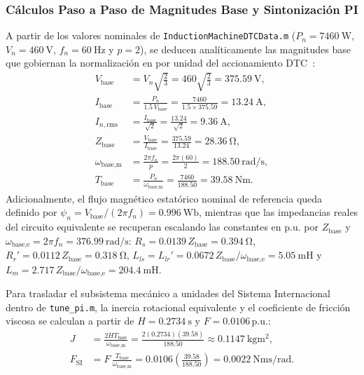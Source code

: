 \subsubsection{Cálculos Paso a Paso de Magnitudes Base y Sintonización PI}
A partir de los valores nominales de \texttt{Induction\allowbreak Machine\allowbreak DTC\allowbreak Data.m} ($P_n=\qty{7460}{\watt}$, $V_n=\qty{460}{\volt}$, $f_n=\qty{60}{\hertz}$ y $p=2$), se deducen analíticamente las magnitudes base que gobiernan la normalización en por unidad del accionamiento DTC~\cite{Bose2006,Krishnan2001}:
\begin{align}
    V_{\text{base}} &= V_n\sqrt{\frac{2}{3}} = 460\sqrt{\frac{2}{3}} = \qty{375.59}{\volt}, \label{eq:vbase_calc}\\
    I_{\text{base}} &= \frac{P_n}{1.5\,V_{\text{base}}} = \frac{7460}{1.5\times 375.59} = \qty{13.24}{\ampere}, \label{eq:ibase_calc}\\
    I_{n,\text{rms}} &= \frac{I_{\text{base}}}{\sqrt{2}} = \frac{13.24}{\sqrt{2}} = \qty{9.36}{\ampere}, \label{eq:inrms_calc}\\
    Z_{\text{base}} &= \frac{V_{\text{base}}}{I_{\text{base}}} = \frac{375.59}{13.24} = \qty{28.36}{\ohm}, \label{eq:zbase_calc}\\
    \omega_{\text{base,m}} &= \frac{2\pi f_n}{p} = \frac{2\pi(60)}{2} = \qty{188.50}{\radian\per\second}, \label{eq:wbasem_calc}\\
    T_{\text{base}} &= \frac{P_n}{\omega_{\text{base,m}}} = \frac{7460}{188.50} = \qty{39.58}{\newton\meter}. \label{eq:tbase_calc}
\end{align}
Adicionalmente, el flujo magnético estatórico nominal de referencia queda definido por $\psi_n = V_{\text{base}}/(2\pi f_n) = \qty{0.996}{\weber}$, mientras que las impedancias reales del circuito equivalente se recuperan escalando las constantes en p.u. por $Z_{\text{base}}$ y $\omega_{\text{base,e}}=2\pi f_n=\qty{376.99}{\radian\per\second}$: $R_s = 0.0139\,Z_{\text{base}} = \qty{0.394}{\ohm}$, $R_r' = 0.0112\,Z_{\text{base}} = \qty{0.318}{\ohm}$, $L_{ls}=L_{lr}' = 0.0672\,Z_{\text{base}}/\omega_{\text{base,e}} = \qty{5.05}{\milli\henry}$ y $L_m = 2.717\,Z_{\text{base}}/\omega_{\text{base,e}} = \qty{204.4}{\milli\henry}$.

Para trasladar el subsistema mecánico a unidades del Sistema Internacional dentro de \texttt{tune\_pi.m}, la inercia rotacional equivalente y el coeficiente de fricción viscosa se calculan a partir de $H=\qty{0.2734}{\second}$ y $F=\num{0.0106}\,\text{p.u.}$:
\begin{align}
    J &= \frac{2 H T_{\text{base}}}{\omega_{\text{base,m}}} = \frac{2(0.2734)(39.58)}{188.50} \approx \qty{0.1147}{\kilogram\meter\squared}, \label{eq:j_si_calc}\\
    F_{\text{SI}} &= F\,\frac{T_{\text{base}}}{\omega_{\text{base,m}}} = 0.0106\left(\frac{39.58}{188.50}\right) = \qty{0.0022}{\newton\meter\second\per\radian}. \label{eq:f_si_calc}
\end{align}

